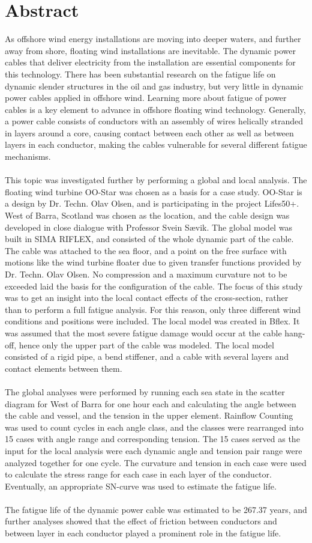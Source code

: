 \chapter*{Abstract}

As offshore wind energy installations are moving into deeper waters, and further away from shore, floating wind installations are inevitable. The dynamic power cables that deliver electricity from the installation are essential components for this technology. There has been substantial research on the fatigue life on dynamic slender structures in the oil and gas industry, but very little in dynamic power cables applied in offshore wind. Learning more about fatigue of power cables is a key element to advance in offshore floating wind technology. Generally, a power cable consists of conductors with an assembly of wires helically stranded in layers around a core, causing contact between each other as well as between layers in each conductor, making the cables vulnerable for several different fatigue mechanisms.\\\\
This topic was investigated further by performing a global and local analysis. The floating wind turbine OO-Star was chosen as a basis for a case study. OO-Star is a design by Dr. Techn. Olav Olsen, and is participating in the project Lifes50+. West of Barra, Scotland was chosen as the location, and the cable design was developed in close dialogue with Professor Svein Sævik. The global model was built in SIMA RIFLEX, and consisted of the whole dynamic part of the cable. The cable was attached to the sea floor, and a point on the free surface with motions like the wind turbine floater due to given transfer functions provided by Dr. Techn. Olav Olsen. No compression and a maximum curvature not to be exceeded laid the basis for the configuration of the cable. The focus of this study was to get an insight into the local contact effects of the cross-section, rather than to perform a full fatigue analysis. For this reason, only three different wind conditions and positions were included. The local model was created in Bflex. It was assumed that the most severe fatigue damage would occur at the cable hang-off, hence only the upper part of the cable was modeled. The local model consisted of a rigid pipe, a bend stiffener, and a cable with several layers and contact elements between them.\\\\ The global analyses were performed by running each sea state in the scatter diagram for West of Barra for one hour each and calculating the angle between the cable and vessel, and the tension in the upper element. Rainflow Counting was used to count cycles in each angle class, and the classes were rearranged into 15 cases with angle range and corresponding tension. The 15 cases served as the input for the local analysis were each dynamic angle and tension pair range were analyzed together for one cycle. The curvature and tension in each case were used to calculate the stress range for each case in each layer of the conductor. Eventually, an appropriate SN-curve was used to estimate the fatigue life.  \\\\
The fatigue life of the dynamic power cable was estimated to be 267.37 years, and further analyses showed that the effect of friction between conductors and between layer in each conductor played a prominent role in the fatigue life.  